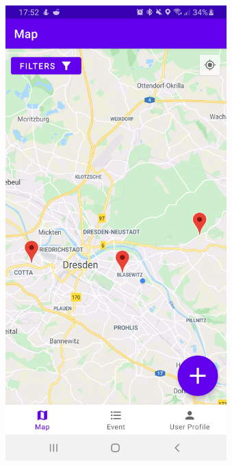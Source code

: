 \documentclass[aspectratio=169]{beamer}
\begin{document}
\begin{frame}
\begin{columns}
\begin{figure}
				\includegraphics[width=1\textwidth]{media/Map.jpg}
			\end{figure}
			 \begin{figure}

\end{figure}
\end{columns}
\end{frame}
\end{document}
